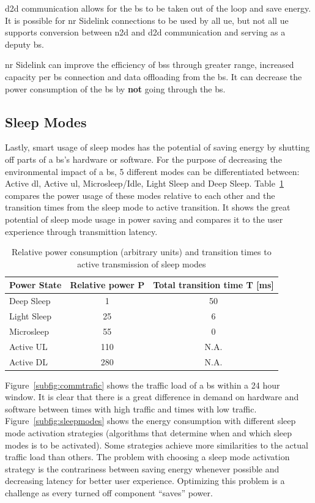 \documentclass[11pt,a4paper]{article}
\begin{document}
\acrlong{d2d} communication allows for the \acrshort{bs} to be taken out of the loop and save energy.
It is possible for \acrshort{nr} Sidelink connections to be used by all \acrlong{ue}, but not all \acrshort{ue} supports conversion between \acrshort{n2d} and \acrshort{d2d} communication and serving as a deputy \acrshort{bs}.

\acrshort{nr} Sidelink can improve the efficiency of \acrlong{bs}s through greater range, increased capacity per \acrshort{bs} connection and data offloading from the \acrshort{bs}.
It can decrease the power consumption of the \acrshort{bs} by \textbf{not} going through the \acrshort{bs}.

\subsection{Sleep Modes}\label{subsec:sleep}
Lastly, smart usage of sleep modes has the potential of saving energy by shutting off parts of a \acrshort{bs}'s hardware or software.
For the purpose of decreasing the environmental impact of a \acrshort{bs}, 5 different modes can be differentiated between: Active \acrshort{dl}, Active \acrshort{ul}, Microsleep/Idle, Light Sleep and Deep Sleep.
Table~\ref{tab:sleeppower} compares the power usage of these modes relative to each other and the transition times from the sleep mode to active transition.
It shows the great potential of sleep mode usage in power saving and compares it to the user experience through transmittion latency.

\begin{table}[t]
  \begin{tabular}{lcc}
    Power State     & Relative power P & Total transition time T [ms] \\
    \hline
    Deep Sleep      & 1   & 50   \\
    Light Sleep     & 25  & 6    \\
    Microsleep      & 55  & 0    \\
    Active UL       & 110 & N.A. \\
    Active DL       & 280 & N.A. \\
  \end{tabular}
  \caption{Relative power consumption (arbitrary units) and transition times to active transmission of sleep modes \citep{energymodeling}}\label{tab:sleeppower}
\end{table}

Figure~\ref{subfig:commtrafic} shows the traffic load of a \acrshort{bs} within a 24 hour window.
It is clear that there is a great difference in demand on hardware and software between times with high traffic and times with low traffic.
Figure~\ref{subfig:sleepmodes} shows the energy consumption with different sleep mode activation strategies (algorithms that determine when and which sleep modes is to be activated).
Some strategies achieve more similarities to the actual traffic load than others.
The problem with choosing a sleep mode activation strategy is the contrariness between saving energy whenever possible and decreasing latency for better user experience.
Optimizing this problem is a challenge as every turned off component \enquote{saves} power.
\end{document}
